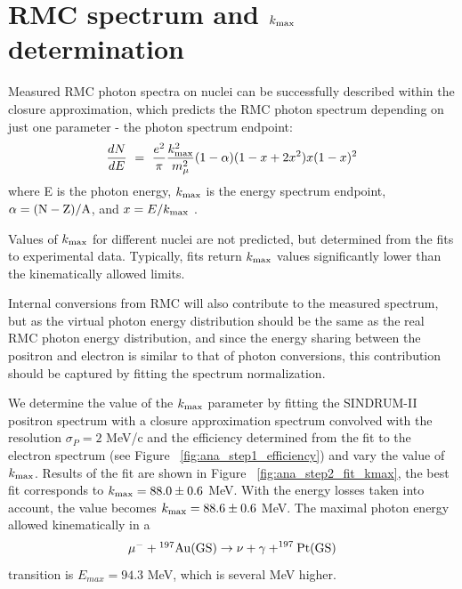 \newpage
\section {RMC spectrum and $k_{\rm max}$ determination}

Measured RMC photon spectra on nuclei can be successfully described within 
the closure approximation, which predicts the RMC photon spectrum depending
on just one parameter - the photon spectrum endpoint:
$$
    \frac{dN}{dE} ~=~ \frac{e^2}{\pi} \frac{k_{\rm max}^2}{ m_{\mu}^2} (1 - \alpha) (1-x+2x^2)x(1-x)^2
$$
where E is the photon energy, $k_{\rm max}$ is the energy spectrum endpoint, $\rm \alpha = (N-Z)/A$,
and $x = E/k_{\rm max}$ \cite{Christillin_1980}.

Values of $k_{\rm max}$ for different nuclei are not predicted, but determined from the fits
to experimental data. Typically, fits return $k_{\rm max}$ values significantly lower than
the kinematically allowed limits. 

Internal conversions from RMC will also contribute to the measured spectrum, but as the virtual
photon energy distribution should be the same as the real RMC photon energy
distribution, and since the energy sharing between the positron and electron
is similar to that of photon conversions, this contribution should be captured by
fitting the spectrum normalization.

We determine the value of the $k_{\rm max}$ parameter by fitting the SINDRUM-II positron spectrum
with a closure approximation spectrum convolved with the resolution $\sigma_P = 2$ MeV/c
and the efficiency determined from the fit to the electron spectrum
(see Figure ~\ref{fig:ana_step1_efficiency}) and vary the value of $k_{\rm max}$.
Results of the fit are shown in Figure ~\ref{fig:ana_step2_fit_kmax}, the best fit
corresponds to $k_{\rm max} = 88.0 \pm 0.6$ MeV.
%
With the energy losses taken into account, the value becomes  $k_{\rm max} = 88.6 \pm 0.6$ MeV.
The maximal photon energy allowed kinematically in a 
$$
\rm \mu^- + \mbox{$\rm ^{197}Au$}(GS) \rightarrow \nu +\gamma + ^{197}Pt(GS)
$$
transition is $E_{max} = 94.3$ MeV, which is several MeV higher.

